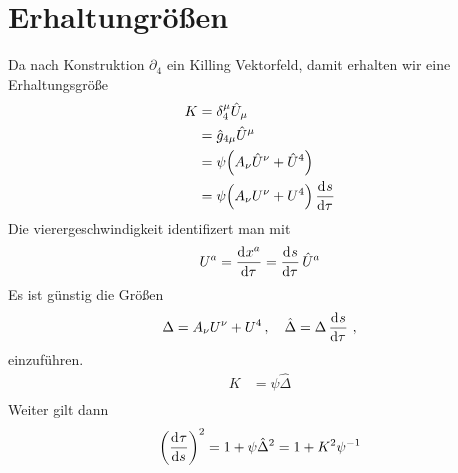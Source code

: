 \section{Erhaltungrößen}
Da nach Konstruktion $\partial_4$ ein Killing Vektorfeld, damit erhalten wir
eine Erhaltungsgröße
\begin{equation}
\begin{split}
K&=\delta^\mu_4\fived{U}_\mu\\
&=\fived{g}_{4\mu}\fived{U}^\mu\\
&=\psi\left(A_\nu\fived{U}^\nu+\fived{U}^4\right)\\
&=\psi\left(A_\nu U^\nu+U^4\right)\dod{s}{\tau}\\
\end{split}
\end{equation}
Die vierergeschwindigkeit identifizert man mit
\begin{equation}
U^a=\dod{x^a}{\tau}=\dod{s}{\tau}\hat{U}^a
\end{equation}
Es ist günstig die Größen
\begin{equation}
\Delta=A_\nu U^\nu+U^4\,,\quad
\fived{\Delta}=\Delta\dod{s}{\tau}\,,
\end{equation}
einzuführen.
\begin{equation}
\begin{split}
K
&=\psi\hat{\Delta}\\
\end{split}
\end{equation}
Weiter gilt dann 
\begin{equation}
\left(\dod{\tau}{s}\right)^2=1+\psi\fived{\Delta}^2=1+K^2\psi^{-1}
\end{equation}

